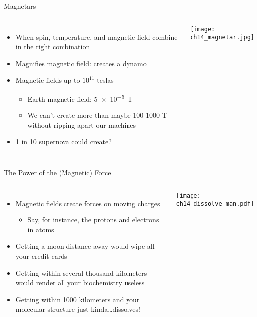 \documentclass[pdf, aspectratio=169]{beamer}
\begin{document}
\begin{frame}{Magnetars}
  \begin{columns}
	\begin{itemize}
	  \item When spin, temperature, and magnetic field combine in the right combination
	  \item Magnifies magnetic field: creates a dynamo
	  \item Magnetic fields up to $10^{11}$ teslas
		\begin{itemize}
		  \item Earth magnetic field: \SI{5e-5}{\tesla}
		  \item We can't create more than maybe 100-1000 T without ripping apart our machines
		\end{itemize}
	  \item 1 in 10 supernova could create?
	\end{itemize}
	\begin{center}
	  \texttt{[image: ch14\_magnetar.jpg]}
	\end{center}
  \end{columns}
\end{frame}

\begin{frame}{The Power of the (Magnetic) Force}
  \begin{columns}
	\begin{itemize}
	  \item Magnetic fields create forces on moving charges
		\begin{itemize}
		  \item Say, for instance, the protons and electrons in atoms
		\end{itemize}
	  \item Getting a moon distance away would wipe all your credit cards
	  \item Getting within several thousand kilometers would render all your biochemistry useless
	  \item Getting within 1000 kilometers and your molecular structure just kinda\ldots dissolves!
	\end{itemize}
	\begin{center}
	  \texttt{[image: ch14\_dissolve\_man.pdf]}
	\end{center}
  \end{columns}
\end{frame}
\end{document}
